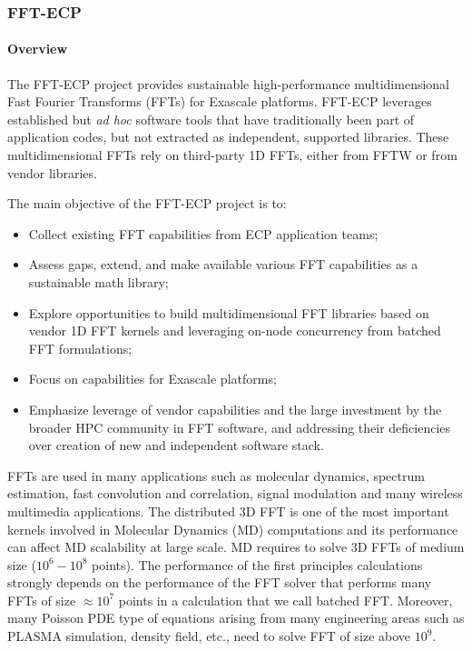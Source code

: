 \subsubsection{ FFT-ECP}\label{subsubsect:fftecp}


\paragraph{Overview}

The FFT-ECP project provides sustainable high-performance multidimensional
Fast Fourier Transforms (FFTs) for Exascale platforms. 
FFT-ECP leverages established but {\it ad hoc} 
software tools that have traditionally been part of application 
codes, but not extracted as independent, supported libraries. 
These multidimensional FFTs rely on third-party 1D FFTs, either from FFTW or 
from vendor libraries.

The main objective of the FFT-ECP project is to:
\begin{itemize}
\item Collect existing FFT capabilities from ECP 
      application teams;
\item Assess gaps, extend, and make available various FFT
      capabilities as a sustainable math library;
\item Explore opportunities to build multidimensional FFT libraries based 
      on vendor 1D FFT kernels and leveraging on-node concurrency from 
      batched FFT formulations;
\item Focus on capabilities for Exascale platforms;
\item Emphasize leverage of vendor capabilities 
      and the large investment by the broader HPC community in FFT
      software, and addressing their 
      deficiencies over creation of new and independent software stack.
\end{itemize}

FFTs are used in many applications such as molecular dynamics, 
spectrum estimation, fast convolution and correlation, signal 
modulation and many wireless multimedia applications. The 
distributed 3D FFT is one of the most important kernels involved 
in Molecular Dynamics (MD) computations and its performance can 
affect MD scalability at large scale. MD requires to solve 3D FFTs 
of medium size ($10^6-10^8$ points). The performance of the first 
principles calculations strongly depends on the performance of the 
FFT solver that performs many FFTs of size $\approx 10^7$ points in 
a calculation that we call batched FFT. Moreover, many Poisson PDE 
type of equations arising from many engineering areas such as PLASMA 
simulation, density field, etc., need to solve FFT of size above $10^9$. 

